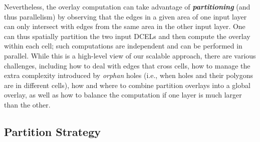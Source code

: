 Nevertheless, the overlay computation can take advantage of \textit{\textbf{partitioning}} (and thus parallelism) by observing that the edges in a given area of one input layer can only intersect with edges from the same area in the other input layer. One can thus spatially partition the two input DCELs and then compute the overlay within each cell; such computations are independent and can be performed in parallel. While this is a high-level view of our scalable approach, there are various challenges, including how to deal with edges that cross cells, how to manage the extra complexity introduced by \textit{orphan} holes (i.e., when holes and their polygons are in different cells), how and where to combine partition overlays into a global overlay, as well as how to balance the computation if one layer is much larger than the other.

\subsection{Partition Strategy} \label{sec:pstrategies}

% 
% 

